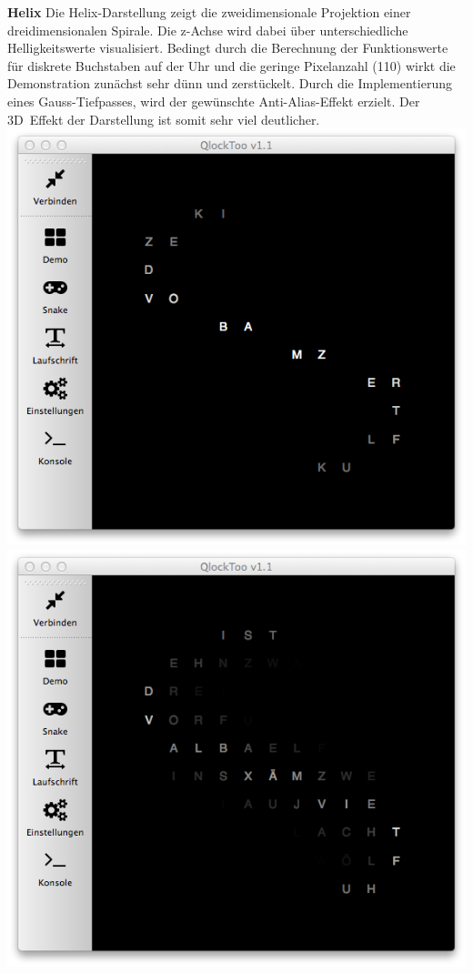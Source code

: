 \begin{multicols}{2}
\textbf{Helix}
Die Helix-Darstellung zeigt die zweidimensionale Projektion einer dreidimensionalen Spirale. Die z-Achse wird dabei über unterschiedliche Helligkeitswerte visualisiert. Bedingt durch die Berechnung der Funktionswerte für diskrete Buchstaben auf der Uhr und die geringe Pixelanzahl (110) wirkt die Demonstration zunächst sehr dünn und zerstückelt. Durch die Implementierung eines Gauss-Tiefpasses, wird der gewünschte Anti-Alias-Effekt erzielt. Der 3D~Effekt der Darstellung ist somit sehr viel deutlicher.
\includegraphics[width=\columnwidth]{Abbildungen/Software/Demo/Helix-ohne-TP}
\includegraphics[width=\columnwidth]{Abbildungen/Software/Demo/Helix2}


\end{multicols}
